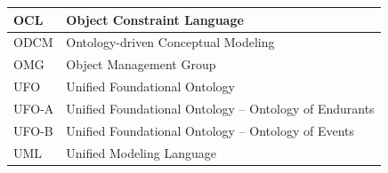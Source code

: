 {
\setlength{\LTleft}{0pt}
\setlength{\LTright}{\fill}

\begin{longtable}{|l|p{}|}
\hline
OCL  & Object Constraint Language \\
\hline
ODCM & Ontology-driven Conceptual Modeling \\
\hline
OMG  & Object Management Group \\
\hline
UFO  & Unified Foundational Ontology \\
\hline
UFO-A  & Unified Foundational Ontology -- Ontology of Endurants \\
\hline
UFO-B  & Unified Foundational Ontology -- Ontology of Events \\
\hline
UML  & Unified Modeling Language \\
\hline
\end{longtable}

}